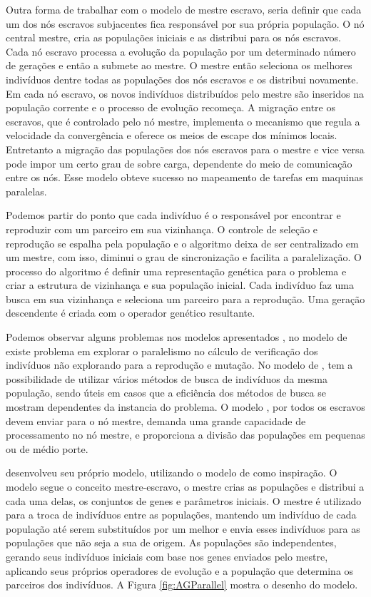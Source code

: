 Outra forma de trabalhar com o modelo de mestre escravo, seria definir que cada um dos nós escravos subjacentes fica responsável por sua própria população. O nó central mestre, cria as populações iniciais e as distribui para os nós escravos. Cada nó escravo processa a evolução da população por um determinado número de gerações e então a submete ao mestre. O mestre então seleciona os melhores indivíduos dentre todas as populações dos nós escravos e os distribui novamente. Em cada nó escravo, os novos indivíduos distribuídos pelo mestre são inseridos na população corrente e o processo de evolução recomeça. A migração entre os escravos, que é controlado pelo nó mestre, implementa o mecanismo que regula a velocidade da convergência e oferece os meios de escape dos mínimos locais. Entretanto a migração das populações dos nós escravos para o mestre e vice versa pode impor um certo grau de sobre carga, dependente do meio de comunicação entre os nós. Esse modelo obteve sucesso no mapeamento de tarefas em maquinas paralelas. \cite{Alaoui}

Podemos partir do ponto que cada indivíduo é o responsável por encontrar e reproduzir com um parceiro em sua vizinhança. O controle de seleção e reprodução se espalha pela população e o algoritmo deixa de ser centralizado em um mestre, com isso, diminui o grau de sincronização e facilita a paralelização. O processo do algoritmo é definir uma representação genética para o problema e criar a estrutura de vizinhança e sua população inicial. Cada indivíduo faz uma busca em sua vizinhança e seleciona um parceiro para a reprodução. Uma geração descendente é criada com o operador genético resultante. \cite{Heinz}

Podemos observar alguns problemas nos modelos apresentados \cite{Vilson}, no modelo de \cite{Jason} existe problema em explorar o paralelismo no cálculo de verificação dos indivíduos não explorando para a reprodução e mutação. No modelo de \cite{Heinz}, tem a possibilidade de utilizar vários métodos de busca de indivíduos da mesma população, sendo úteis em casos que a eficiência dos métodos de busca se mostram dependentes da instancia do problema. O modelo \cite{Alaoui}, por todos os escravos devem enviar para o nó mestre, demanda uma grande capacidade de processamento no nó mestre, e proporciona a divisão das populações em pequenas ou de médio porte.

 \cite{Vilson} desenvolveu seu próprio modelo, utilizando o modelo de \cite{Alaoui} como inspiração. O modelo segue o conceito mestre-escravo, o mestre crias as populações e distribui a cada uma delas, os conjuntos de genes e parâmetros iniciais. O mestre é utilizado para a troca de indivíduos entre as populações, mantendo um indivíduo de cada população até serem substituídos por um melhor e envia esses indivíduos para as populações que não seja a sua de origem. As populações são independentes, gerando seus indivíduos iniciais com base nos genes enviados pelo mestre, aplicando seus próprios operadores de evolução e a população que determina os parceiros dos indivíduos.
 A Figura \ref{fig:AGParallel} mostra o desenho do modelo.
 
